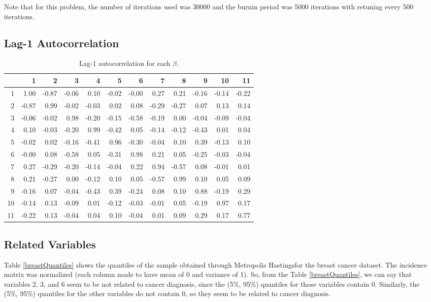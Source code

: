 \documentclass{article}
\begin{document}
Note that for this problem, the number of iterations used was 30000 and the burnin period was 5000 iterations with retuning every 500 iterations.

\subsection{Lag-1 Autocorrelation}
\begin{table}[!ht]
\centering
\begin{tabular}{|r|rrrrrrrrrrr|}
\hline
& 1 & 2 & 3 & 4 & 5 & 6 & 7 & 8 & 9 & 10 & 11 \\ 
\hline
1 & 1.00 & -0.87 & -0.06 & 0.10 & -0.02 & -0.00 & 0.27 & 0.21 & -0.16 & -0.14 & -0.22 \\ 
2 & -0.87 & 0.99 & -0.02 & -0.03 & 0.02 & 0.08 & -0.29 & -0.27 & 0.07 & 0.13 & 0.14 \\ 
3 & -0.06 & -0.02 & 0.98 & -0.20 & -0.15 & -0.58 & -0.19 & 0.00 & -0.04 & -0.09 & -0.04 \\ 
4 & 0.10 & -0.03 & -0.20 & 0.99 & -0.42 & 0.05 & -0.14 & -0.12 & -0.43 & 0.01 & 0.04 \\ 
5 & -0.02 & 0.02 & -0.16 & -0.41 & 0.96 & -0.30 & -0.04 & 0.10 & 0.39 & -0.13 & 0.10 \\ 
6 & -0.00 & 0.08 & -0.58 & 0.05 & -0.31 & 0.98 & 0.21 & 0.05 & -0.25 & -0.03 & -0.04 \\ 
7 & 0.27 & -0.29 & -0.20 & -0.14 & -0.04 & 0.22 & 0.94 & -0.57 & 0.08 & -0.01 & 0.01 \\ 
8 & 0.21 & -0.27 & 0.00 & -0.12 & 0.10 & 0.05 & -0.57 & 0.99 & 0.10 & 0.05 & 0.09 \\ 
9 & -0.16 & 0.07 & -0.04 & -0.43 & 0.39 & -0.24 & 0.08 & 0.10 & 0.88 & -0.19 & 0.29 \\ 
10 & -0.14 & 0.13 & -0.09 & 0.01 & -0.12 & -0.03 & -0.01 & 0.05 & -0.19 & 0.97 & 0.17 \\ 
11 & -0.22 & 0.13 & -0.04 & 0.04 & 0.10 & -0.04 & 0.01 & 0.09 & 0.29 & 0.17 & 0.77 \\ 
\hline
\end{tabular}
\caption{Lag-1 autocorrelation for each $\beta$.}
\end{table}

\subsection{Related Variables}
Table \ref{breastQuantiles} shows the quantiles of the sample obtained through Metropolis Hastingsfor the breast cancer dataset. The incidence matrix was normalized (each column made to have mean of 0 and variance of 1). So, from the Table \ref{breastQuantiles}, we can say that variables 2, 3, and 6 seem to be not related to cancer diagnosis, since the (5\%, 95\%) quantiles for those variables contain 0. Similarly, the (5\%, 95\%) quantiles for the other variables do not contain 0, so they seem to be related to cancer diagnosis.
\end{document}
